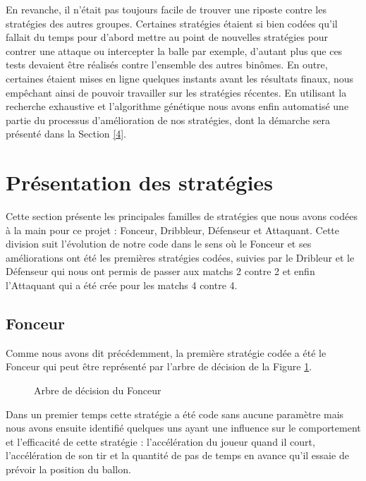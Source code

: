 \documentclass[a4paper,12pt]{article}
\numberwithin{equation}{section}
\begin{document}
En revanche, il n’était pas toujours facile de trouver une riposte contre les stratégies des autres groupes. Certaines stratégies étaient si bien codées qu’il fallait du temps pour d’abord mettre au point de nouvelles stratégies pour contrer une attaque ou intercepter la balle par exemple, d’autant plus que ces tests devaient être réalisés contre l’ensemble des autres binômes. En outre, certaines étaient mises en ligne quelques instants avant les résultats finaux, nous empêchant ainsi de pouvoir travailler sur les stratégies récentes. En utilisant la recherche exhaustive et l'algorithme génétique nous avons enfin automatisé une partie du processus d’amélioration de nos stratégies, dont la démarche sera présenté dans la Section \ref{4}.

\section{Présentation des stratégies}

Cette section présente les principales \og familles \fg{} de stratégies que nous avons codées à la main pour ce projet : Fonceur, Dribbleur, Défenseur et Attaquant. Cette division suit l'évolution de notre code dans le sens où le Fonceur et ses améliorations ont été les premières stratégies codées, suivies par le Dribleur et le Défenseur qui nous ont permis de passer aux matchs 2 contre 2 et enfin l'Attaquant qui a été crée pour les matchs 4 contre 4.   

\subsection{Fonceur}

Comme nous avons dit précédemment, la première stratégie codée a été le Fonceur qui peut être représenté par l'arbre de décision de la Figure \ref{Figure1}.

\begin{figure}[ht]
\centering

\caption{Arbre de décision du Fonceur}
\label{Figure1}
\end{figure}

Dans un premier temps cette stratégie a été code sans aucune paramètre mais nous avons ensuite identifié quelques uns ayant une influence sur le comportement et l’efficacité de cette stratégie : l’accélération du joueur quand il court, l'accélération de son tir et la quantité de pas de temps en avance qu'il essaie de prévoir la position du ballon.
\end{document}
